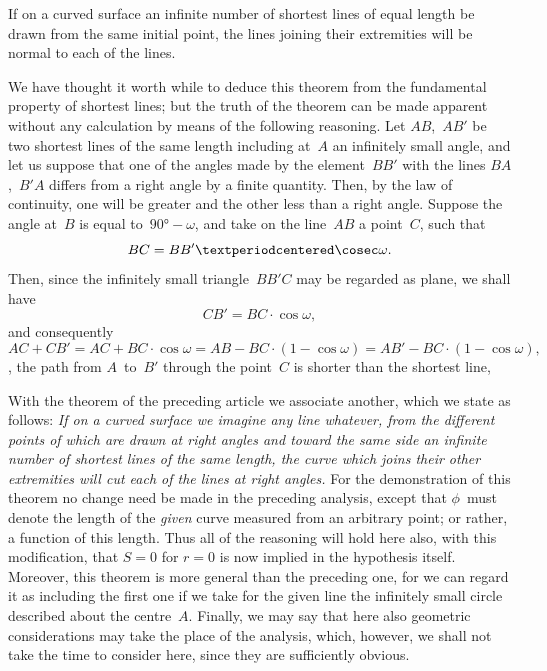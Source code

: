 \begin{Theorem}
If on a curved surface an infinite number of shortest lines of equal length
be drawn from the same initial point, the lines joining their extremities will be normal to
each of the lines.
\end{Theorem}

We have thought it worth while to deduce this theorem from the fundamental
property of shortest lines; but the truth of the theorem can be made apparent without
any calculation by means of the following reasoning. Let $AB$,~$AB'$ be two
shortest lines of the same length including at~$A$ an infinitely small angle, and let us
suppose that one of the angles made by the element~$BB'$ with the lines $BA$,~$B'A$
differs from a right angle by a finite quantity. Then, by the law of continuity, one
will be greater and the other less than a right angle. Suppose the angle at~$B$ is
equal to~$90° - \omega$, and take on the line~$AB$ a point~$C$, such that
\[
BC = BB'·\cosec \omega.
\]
Then, since the infinitely small triangle~$BB'C$ may be regarded as plane, we shall have
\[
CB' = BC·\cos \omega,
\]
and consequently
\[
AC + CB' = AC + BC·\cos \omega
  = AB - BC·(1- \cos \omega)
  = AB' - BC·(1 - \cos \omega),
\]
\ie, the path from $A$~to~$B'$ through the point~$C$ is shorter than the shortest line,
\QEA



With the theorem of the preceding article we associate another, which we state
as follows: \textit{If on a curved surface we imagine any line whatever, from the different points
of which are drawn at right angles and toward the same side an infinite number of shortest
lines of the same length, the curve which joins their other extremities will cut each of the
lines at right angles.} For the demonstration of this theorem no change need be made
in the preceding analysis, except that $\phi$~must denote the length of the \emph{given} curve
measured from an arbitrary point; or rather, a function of this length. Thus all of
the reasoning will hold here also, with this modification, that $S = 0$ for $r = 0$ is
now implied in the hypothesis itself. Moreover, this theorem is more general than
the preceding one, for we can regard it as including the first one if we take for the
given line the infinitely small circle described about the centre~$A$. Finally, we may
say that here also geometric considerations may take the place of the analysis, which,
however, we shall not take the time to consider here, since they are sufficiently
obvious.



